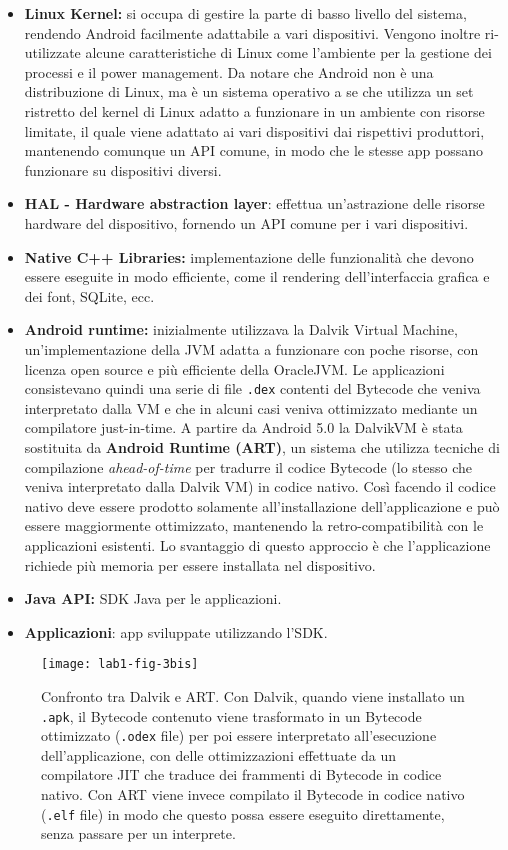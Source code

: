 \begin{itemize}
	\item \textbf{Linux Kernel:} si occupa di gestire la parte di basso livello
		del sistema, rendendo Android facilmente adattabile a vari
		dispositivi. Vengono inoltre ri-utilizzate alcune caratteristiche di
		Linux come l'ambiente per la gestione dei processi e il power
		management. Da notare che Android non è una distribuzione di Linux, ma
		è un sistema operativo a se che utilizza un set ristretto del kernel
		di Linux adatto a funzionare in un ambiente con risorse limitate, il
		quale viene adattato ai vari dispositivi dai rispettivi produttori,
		mantenendo comunque un API comune, in modo che le stesse app possano
		funzionare su dispositivi diversi.
	\item
		\textbf{HAL - Hardware abstraction layer}: effettua un'astrazione
		delle risorse hardware del dispositivo, fornendo un API comune per i
		vari dispositivi.
	\item
		\textbf{Native C++ Libraries:} implementazione delle funzionalità che
		devono essere eseguite in modo efficiente, come il rendering
		dell'interfaccia grafica e dei font, SQLite, ecc.
	\item
		\textbf{Android runtime:} inizialmente utilizzava la Dalvik Virtual
		Machine, un'implementazione della JVM adatta a funzionare con poche
		risorse, con licenza open source e più efficiente della OracleJVM. Le
		applicazioni consistevano quindi una serie di file \texttt{.dex} contenti del
		Bytecode che veniva interpretato dalla VM e che in alcuni casi veniva
		ottimizzato mediante un compilatore just-in-time. A partire da Android
		5.0 la DalvikVM è stata sostituita da \textbf{Android Runtime (ART)},
		un sistema che utilizza tecniche di compilazione \textit{ahead-of-time} per
		tradurre il codice Bytecode (lo stesso che veniva interpretato dalla
		Dalvik VM) in codice nativo. Così facendo il codice nativo deve essere
		prodotto solamente all'installazione dell'applicazione e può essere
		maggiormente ottimizzato, mantenendo la retro-compatibilità con le
		applicazioni esistenti. Lo svantaggio di questo approccio è che
		l'applicazione richiede più memoria per essere installata nel
		dispositivo.
	\item
		\textbf{Java API:} SDK Java per le applicazioni.
	\item
		\textbf{Applicazioni}: app sviluppate utilizzando l'SDK.
\end{itemize}

\begin{figure}[htbp]
	\centering
	\texttt{[image: lab1-fig-3bis]}
	\caption[Confronto tra Dalvik e ART]{Confronto tra Dalvik e ART. Con Dalvik, quando viene installato un \texttt{.apk}, il Bytecode contenuto viene trasformato in un Bytecode ottimizzato (\texttt{.odex} file) per poi essere interpretato all'esecuzione dell'applicazione, con delle ottimizzazioni effettuate da un compilatore JIT che traduce dei frammenti di Bytecode in codice nativo. Con ART viene invece compilato il Bytecode in codice nativo (\texttt{.elf} file) in modo che questo possa essere eseguito direttamente, senza passare per un interprete.}
\end{figure}

